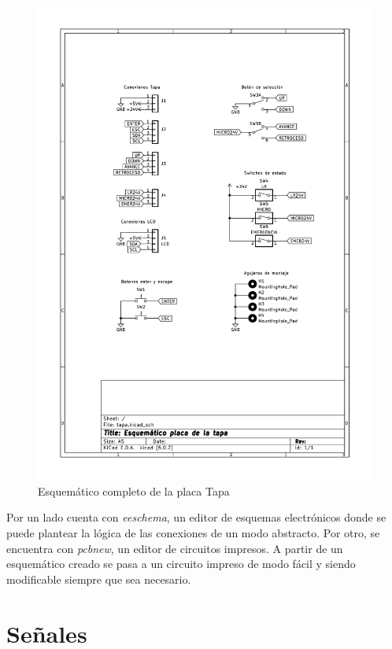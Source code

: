     \begin{figure}[hbtp]
        \centering
        \includegraphics[width=\textwidth]{03-placa/tapa.pdf}
        \caption{Esquemático completo de la placa Tapa}
        \label{fig:esquematapa}
        \end{figure}

Por un lado cuenta con \textit{eeschema}, un editor de esquemas electrónicos donde se puede plantear
la lógica de las conexiones de un modo abstracto. Por otro, se encuentra con \textit{pcbnew}, un editor
de circuitos impresos. A partir de un esquemático creado se pasa a un circuito impreso de modo fácil y
siendo modificable siempre que sea necesario.

\section{Señales}

